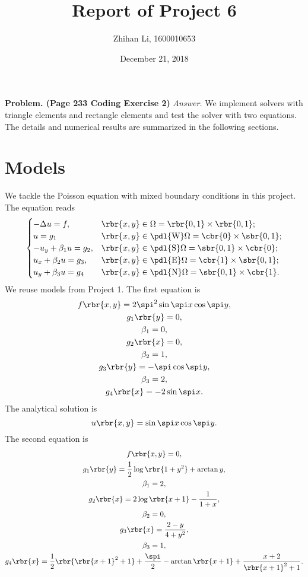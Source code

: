 \documentclass[english, nochinese]{pnote}
\title{Report of Project 6}
\author{Zhihan Li, 1600010653}
\date{December 21, 2018}
\begin{document}
\maketitle
\textbf{Problem. (Page 233 Coding Exercise 2)} \textit{Answer.} We implement solvers with triangle elements and rectangle elements and test the solver with two equations. The details and numerical results are summarized in the following sections.

\section{Models}

We tackle the Poisson equation with mixed boundary conditions in this project. The equation reads
\begin{equation}
\begin{cases}
-\Delta u = f, & \rbr{ x, y } \in \Omega = \rbr{ 0, 1 } \times \rbr{ 0, 1 }; \\
u = g_1 & \rbr{ x, y } \in \pdl{\text{W}} \Omega = \cbr{0} \times \sbr{ 0, 1 }; \\
-u_y + \beta_1 u = g_2, & \rbr{ x, y } \in \pdl{\text{S}} \Omega = \sbr{ 0, 1 } \times \cbr{0}; \\
u_x + \beta_2 u = g_3, & \rbr{ x, y } \in \pdl{\text{E}} \Omega = \cbr{1} \times \sbr{ 0, 1 }; \\
u_y + \beta_3 u = g_4 & \rbr{ x, y } \in \pdl{\text{N}} \Omega = \sbr{ 0, 1 } \times \cbr{1}.
\end{cases}
\end{equation}
We reuse models from Project 1. The first equation is
\begin{gather}
f \rbr{ x, y } = 2 \spi^2 \sin \spi x \cos \spi y, \\
g_1 \rbr{y} = 0, \\
\beta_1 = 0, \\
g_2 \rbr{x} = 0, \\
\beta_2 = 1, \\
g_3 \rbr{y} = -\spi \cos \spi y, \\
\beta_3 = 2, \\
g_4 \rbr{x} = -2 \sin \spi x.
\end{gather}
The analytical solution is
\begin{equation}
u \rbr{ x, y } = \sin \spi x \cos \spi y.
\end{equation}
The second equation is
\begin{gather}
f \rbr{ x, y } = 0, \\
g_1 \rbr{y} = \frac{1}{2} \log \rbr{ 1 + y^2 } + \arctan y, \\
\beta_1 = 2, \\
g_2 \rbr{x} = 2 \log \rbr{ x + 1 } - \frac{1}{ 1 + x }, \\
\beta_2 = 0, \\
g_3 \rbr{x} = \frac{ 2 - y }{ 4 + y^2 }, \\
\beta_3 = 1, \\
g_4 \rbr{x} = \frac{1}{2} \rbr{ \rbr{ x + 1 }^2 + 1 } + \frac{\spi}{2} - \arctan \rbr{ x + 1 } + \frac{ x + 2 }{ \rbr{ x + 1 }^2 + 1 }.
\end{gather}
\end{document}
